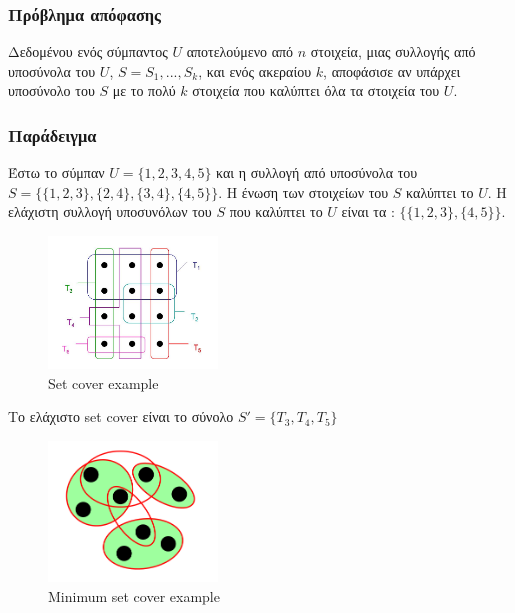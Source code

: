 \subsubsection{Πρόβλημα απόφασης}
Δεδομένου ενός σύμπαντος $U$ αποτελούμενο από $n$ στοιχεία, μιας συλλογής από υποσύνολα του $U$, $S = {S_1,...,S_k}$, και ενός ακεραίου $k$, αποφάσισε αν υπάρχει υποσύνολο του $S$ με το πολύ $k$ στοιχεία που καλύπτει όλα τα στοιχεία του $U$.

\subsubsection{Παράδειγμα}
Έστω το σύμπαν $U = \{1, 2, 3, 4 ,5\}$ και η συλλογή από υποσύνολα του $S=\{\{1,2,3\},\{2,4\},\{3,4\},\{4,5\}\}
$. Η ένωση των στοιχείων του $S$ καλύπτει το $U$. H ελάχιστη συλλογή υποσυνόλων του $S$ που καλύπτει το $U$ είναι τα : $\{\{1,2,3\},\{4,5\}\}$.

\begin{figure}[H]
\caption{Set cover example}
\centering
\includegraphics[width=0.4\textwidth]{Figures/set_cover.png}\centering
\end{figure}

Το ελάχιστο set cover είναι το σύνολο $S' = \{T_3, T_4, T_5\}$

\begin{figure}[H]
\caption{Minimum set cover example}
\centering
\includegraphics[width=0.4\textwidth]{Figures/min_set_cover.png}\centering
\end{figure}


